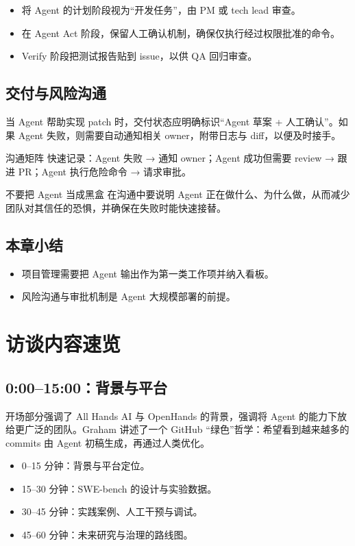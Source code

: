 \documentclass[a4paper]{article}
\begin{document}
\begin{itemize}
    \item 将 Agent 的计划阶段视为“开发任务”，由 PM 或 tech lead 审查。
    \item 在 Agent Act 阶段，保留人工确认机制，确保仅执行经过权限批准的命令。
    \item Verify 阶段把测试报告贴到 issue，以供 QA 回归审查。
\end{itemize}

\subsection{交付与风险沟通}
当 Agent 帮助实现 patch 时，交付状态应明确标识“Agent 草案 + 人工确认”。如果 Agent 失败，则需要自动通知相关 owner，附带日志与 diff，以便及时接手。

 \begin{knowledgebox}{沟通矩阵}
快速记录：Agent 失败 → 通知 owner；Agent 成功但需要 review → 跟进 PR；Agent 执行危险命令 → 请求审批。
\end{knowledgebox}

\begin{warningbox}{不要把 Agent 当成黑盒}
在沟通中要说明 Agent 正在做什么、为什么做，从而减少团队对其信任的恐惧，并确保在失败时能快速接替。
\end{warningbox}

\subsection{本章小结}
\begin{itemize}
    \item 项目管理需要把 Agent 输出作为第一类工作项并纳入看板。
    \item 风险沟通与审批机制是 Agent 大规模部署的前提。
\end{itemize}

\section{访谈内容速览}
\subsection{0:00--15:00：背景与平台}
开场部分强调了 All Hands AI 与 OpenHands 的背景，强调将 Agent 的能力下放给更广泛的团队。Graham 讲述了一个 GitHub “绿色”哲学：希望看到越来越多的 commits 由 Agent 初稿生成，再通过人类优化。

\begin{itemize}
    \item 0--15 分钟：背景与平台定位。
    \item 15--30 分钟：SWE-bench 的设计与实验数据。
    \item 30--45 分钟：实践案例、人工干预与调试。
    \item 45--60 分钟：未来研究与治理的路线图。
\end{itemize}
\end{document}
